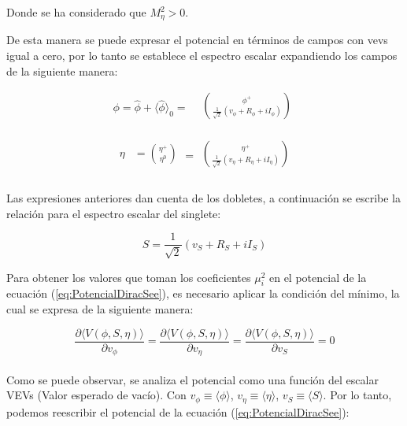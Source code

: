 \documentclass[12pt]{article}
\begin{document}
Donde se ha considerado que $M_\eta^2>0$. 


De esta manera se puede expresar el potencial en términos de campos con
vevs igual a cero, por lo tanto se establece el espectro escalar expandiendo los campos de la siguiente manera: 

\begin{equation}
\label{eq:campophi}
    \phi=\hat\phi+ \langle \hat\phi \rangle_0 = \begin{aligned}
  &  \binom{\phi^{+}}{\frac{1}{\sqrt{2}}(v_\phi+ R_\phi + iI_\phi) } \\ 
\end{aligned}
\end{equation}


\begin{equation}
\label{eq:campoeta}
\begin{aligned}
 \eta & = \binom{\eta^{+}}{\eta^{0} } \\ 
\end{aligned} = 
\begin{aligned}
 \binom{\eta^{+}}{\frac{1}{\sqrt{2}}(v_\eta + R_\eta + iI_\eta) } \\ 
\end{aligned}
\end{equation} \\

Las expresiones anteriores dan cuenta de los dobletes, a continuación se escribe la relación para el espectro escalar del singlete:

\begin{equation}
    \label{eq:singlete}
    S=\frac{1}{\sqrt{2}}(v_S+ R_S+iI_S)
\end{equation}


Para obtener los valores que toman los coeficientes $\mu_i^2$ en el potencial de la ecuación (\ref{eq:PotencialDiracSee}), es necesario aplicar la condición del mínimo, la cual se expresa de la siguiente manera: 



\begin{equation}
    \frac{\partial{\langle V(\phi, S, \eta) }\rangle }{\partial v_\phi} = \frac{\partial{\langle V(\phi, S, \eta) }\rangle }{\partial v_\eta}= \frac{\partial{\langle V(\phi, S, \eta) }\rangle }{\partial v_S}= 0
\end{equation}\\ 

Como se puede observar, se analiza el potencial como una función del escalar VEVs (Valor esperado de vacío). Con  $v_\phi \equiv \langle \phi \rangle$,  $v_\eta \equiv \langle \eta \rangle$, $v_S \equiv \langle S \rangle$. Por lo tanto, podemos reescribir  el potencial  de la ecuación     (\ref{eq:PotencialDiracSee}): 
\end{document}
